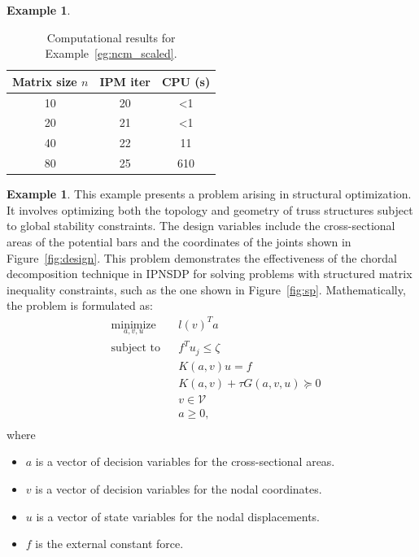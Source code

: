 \documentclass[]{interact}
\theoremstyle{plain}%
\theoremstyle{definition}
\newtheorem{example}[theorem]{Example}
\theoremstyle{remark}
\begin{document}
\begin{example}
\begin{table}[b]\label{tab:ncm}
\centering
\caption{Computational results for Example~\ref{eg:ncm_scaled}.}
\label{tab:ncm}
\begin{tabular}{ccc}
\toprule
Matrix size \( n \) & IPM iter & CPU (s) \\
\midrule
10  & 20 & <1 \\
20  & 21 & <1\\
40  & 22 & 11 \\
80  & 25 & 610\\
\bottomrule
\end{tabular}
\end{table}
\end{example}

\begin{example}\label{eg:topgeo}
This example presents a problem arising in structural optimization. It involves optimizing both the topology and geometry of truss structures subject to global stability constraints. The design variables include the cross-sectional areas of the potential bars and the coordinates of the joints shown in Figure~\ref{fig:design}. This problem demonstrates the effectiveness of the chordal decomposition technique in IPNSDP for solving problems with structured matrix inequality constraints, such as the one shown in Figure~\ref{fig:sp}. Mathematically, the problem is formulated as:
\begin{equation}
\begin{aligned}
\label{eq:mlPrimal}
& \underset{a,v,u}{\text{minimize}}
& & l(v)^T a \\
& \text{subject to}
&& f^T u_j \leq \zeta\\
& & & K(a,v) u = f \\
& & & K(a,v)+\tau G(a,v,u) \succeq 0 \\
& & & v \in \mathcal{V} \\
& & & a \geq 0, \\
\end{aligned}
\end{equation}
where
\begin{itemize}
    \item $a$ is a vector of decision variables for the cross-sectional areas.
    \item $v$ is a vector of decision variables for the nodal coordinates.
    \item $u$ is a vector of  state variables for the nodal displacements.
    \item $f$ is the external constant force.

\end{itemize}
\end{example}
\end{document}
